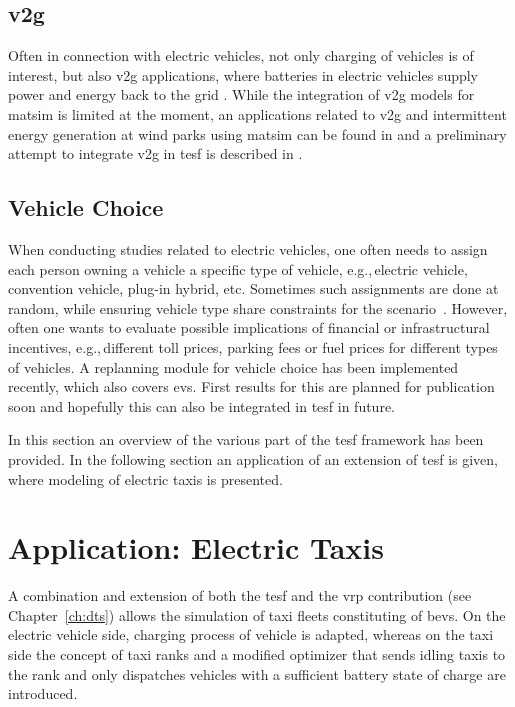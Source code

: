 \subsection{\protect\gls{v2g}}
Often in connection with electric vehicles, not only charging of vehicles is of interest, but also \gls{v2g} applications, where batteries in electric vehicles supply power and energy back to the grid \citep[][]{KemptonTomic_JPS_2005}. While the integration of \gls{v2g} models for \gls{matsim} is limited at the moment, an applications related to \gls{v2g} and intermittent energy generation at wind parks using \gls{matsim} can be found in \citet[][]{GalusAndersson_CIGRE_2011} and a preliminary attempt to integrate \gls{v2g} in \gls{tesf} is described in \citet[][]{WaraichEtAl_JanssensEtAl_2014, Schieffer_MastersThesis_2011}.

\subsection{Vehicle Choice}
When conducting studies related to electric vehicles, one often needs to assign each person owning a vehicle a specific type of vehicle, e.g.,\,electric vehicle, convention vehicle, plug-in hybrid, etc. Sometimes such assignments are done at random, while ensuring vehicle type share constraints for the scenario \,\citep[e.g.,][]{WaraichEtAl_JanssensEtAl_2014}. However, often one wants to evaluate possible implications of financial or infrastructural incentives, e.g.,\,different toll prices, parking fees or fuel prices for different types of vehicles. A replanning module for vehicle choice has been implemented recently, which also covers \glspl{ev}. First results for this are planned for publication soon and hopefully this can also be integrated in \gls{tesf} in future.

In this section an overview of the various part of the \gls{tesf} framework has been provided. In the following section an application of an extension of \gls{tesf} is given, where modeling of electric taxis is presented.

\section{Application: Electric Taxis} %
A combination and extension of both the \gls{tesf} and the \gls{vrp} contribution (see Chapter~\ref{ch:dts}) allows the simulation of taxi fleets constituting of \glspl{bev}.
On the electric vehicle side, charging process of vehicle is adapted, whereas on the taxi side the concept of taxi ranks and a modified optimizer that sends idling taxis to the rank and only dispatches vehicles with a sufficient battery state of charge are introduced. 

